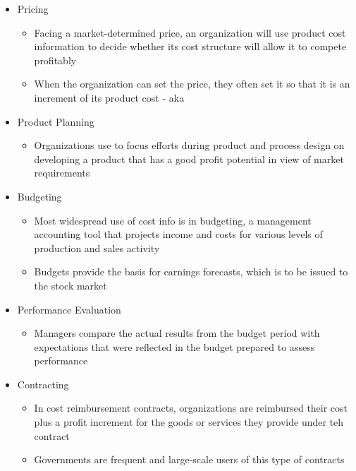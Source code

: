 \documentclass[letterpaper, 12pt]{article}
\newcommand{\red}[1]{{\color{red}{#1}}}
\begin{document}
    \begin{itemize}
        \item Pricing
        \begin{itemize}
            \item Facing a market-determined price, an organization will use product cost information to decide whether its cost structure will allow it to compete profitably
            \item When the organization can set the price, they often set it so that it is an increment of its product cost - aka \red{cost plus pricing}
        \end{itemize}
        \item Product Planning
        \begin{itemize}
            \item Organizations use \red{target costing} to focus efforts during product and process design on developing a product that has a good profit potential in view of market requirements
        \end{itemize}
        \item Budgeting
        \begin{itemize}
            \item Most widespread use of cost info is in budgeting, a management accounting tool that projects income and costs for various levels of production and sales activity
            \item Budgets provide the basis for earnings forecasts, which is to be issued to the stock market
        \end{itemize}
        \item Performance Evaluation
        \begin{itemize}
            \item Managers compare the actual results from the budget period with expectations that were reflected in the budget prepared to assess performance
        \end{itemize}
        \item Contracting
        \begin{itemize}
            \item In cost reimbursement contracts, organizations are reimbursed their cost plus a profit increment for the goods or services they provide under teh contract
            \item Governments are frequent and large-scale users of this type of contracts
        \end{itemize}
    \end{itemize}
\end{document}
